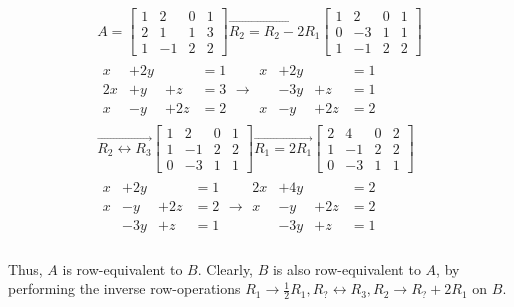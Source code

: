 \documentclass[../main.tex]{subfiles}
\begin{document}
\begin{example}
$$
\begin{aligned}
	A =
	\left[\begin{array}{ccc|c}
	1 & 2 & 0 & 1 \\
	2 & 1 & 1 & 3 \\
	1 & -1 & 2 & 2
	\end{array}\right]
	\overrightarrow{R_2 = R_2 -2 R_1 }
	\left[\begin{array}{ccc|c}
	1 & 2 & 0 & 1 \\
	0 & -3 & 1 & 1 \\
	1 & -1 & 2 & 2
	\end{array}\right]\\
	\begin{array}{cccc}
	x& +2y &&=1\\
	2x& +y& +z &= 3\\
	x & - y& +2z &= 2
	\end{array}
	\longrightarrow
	\begin{array}{cccc}
	x& +2y &&=1\\
	  & -3y& +z &= 1\\
	x & - y& +2z &= 2
	\end{array}\\
	\overrightarrow{R_2 \leftrightarrow R_3 }
	\left[\begin{array}{ccc|c}
	1 & 2 & 0 & 1 \\
	1 & -1 & 2 & 2 \\
	0 & -3 & 1 & 1
	\end{array}\right]
	\overrightarrow{R_1 = 2 R_1 }
	\left[\begin{array}{ccc|c}
	2 & 4 & 0 & 2 \\
	1 & -1 & 2 & 2 \\
	0 & -3 & 1 & 1
	\end{array}\right]\\
	\begin{array}{cccc}
		x& +2y & &=1\\
		x& -y& +2z &= 2\\
		  & -3y& +z &= 1
	\end{array}
	\longrightarrow
	\begin{array}{cccc}
		2x& +4y & &=2\\
		x& -y& +2z &= 2\\
		& -3y& +z &= 1
	\end{array}\\
\end{aligned}
$$

Thus, $A$ is row-equivalent to $B .$ Clearly, $B$ is also row-equivalent to $A$, by performing the inverse row-operations $R_{1} \rightarrow \frac{1}{2} R_{1}, R_{?} \leftrightarrow R_{3}, R_{2} \rightarrow R_{?}+2 R_{1}$ on $B$.
\end{example}
\end{document}
